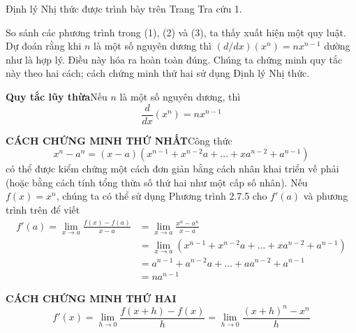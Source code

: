 \noindent
\begin{minipage}[t]{0.26\textwidth}
    \vspace*{318pt}
    \raggedright\fontsize{8.5pt}{11.5pt}\selectfont\textsf{Định lý Nhị thức được trình bày trên Trang Tra cứu 1.}
\end{minipage}%
\hfill
\begin{minipage}[t]{0.71\textwidth}
    \setlength{\parindent}{0pt}
    \setlength{\parskip}{6pt}
    
    So sánh các phương trình trong (1), (2) và (3), ta thấy xuất hiện một quy luật. Dự đoán rằng khi $n$ là một số nguyên dương thì $(d/dx)(x^n) = nx^{n-1}$ dường như là hợp lý. Điều này hóa ra hoàn toàn đúng. Chúng ta chứng minh quy tắc này theo hai cách; cách chứng minh thứ hai sử dụng Định lý Nhị thức.

    \vspace{2pt}
    \begin{definitionbox}
        \noindent\textbf{\textsf{\color{stewartred}Quy tắc lũy thừa}}\quad Nếu $n$ là một số nguyên dương, thì
        \vspace{-3pt}
        \[
        \frac{d}{dx}(x^n) = nx^{n-1}
        \]
    \end{definitionbox}
    \vspace{2pt}

    \noindent\textbf{\textsf{\color{stewartred}CÁCH CHỨNG MINH THỨ NHẤT}}\quad Công thức
    \[
    x^n - a^n = (x - a)(x^{n-1} + x^{n-2}a + \dots + xa^{n-2} + a^{n-1})
    \]
    có thể được kiểm chứng một cách đơn giản bằng cách nhân khai triển vế phải (hoặc bằng cách tính tổng thừa số thứ hai như một cấp số nhân). Nếu $f(x) = x^n$, chúng ta có thể sử dụng Phương trình 2.7.5 cho $f'(a)$ và phương trình trên để viết
    \[
    \begin{aligned}
    f'(a) = \lim_{x \to a} \frac{f(x) - f(a)}{x - a} &= \lim_{x \to a} \frac{x^n - a^n}{x - a} \\[5pt]
    &= \lim_{x \to a} (x^{n-1} + x^{n-2}a + \dots + xa^{n-2} + a^{n-1}) \\[5pt]
    &= a^{n-1} + a^{n-2}a + \dots + aa^{n-2} + a^{n-1} \\[5pt]
    &= na^{n-1}
    \end{aligned}
    \]

    \noindent\textbf{\textsf{\color{stewartred}CÁCH CHỨNG MINH THỨ HAI}}
    \[
    f'(x) = \lim_{h \to 0} \frac{f(x + h) - f(x)}{h} = \lim_{h \to 0} \frac{(x + h)^n - x^n}{h}
    \]


\end{minipage}
